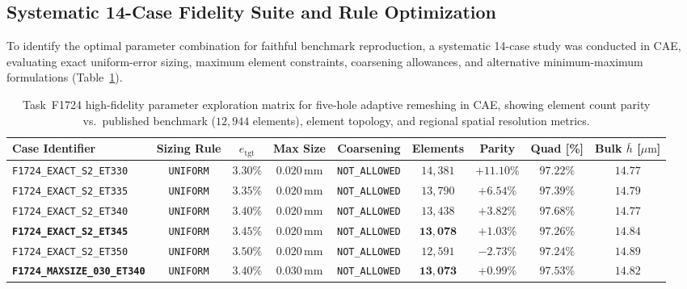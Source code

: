 \subsection{Systematic 14-Case Fidelity Suite and Rule Optimization}
\label{subsec:f1724_fidelity_suite}

To identify the optimal parameter combination for faithful benchmark reproduction, a systematic 14-case study was conducted in \Abaqus CAE, evaluating exact uniform-error sizing, maximum element constraints, coarsening allowances, and alternative minimum-maximum formulations (Table~\ref{tab:f1724_fidelity_matrix}).

\begin{table}[htbp]
\centering
\caption{Task~F1724 high-fidelity parameter exploration matrix for five-hole adaptive remeshing in \Abaqus CAE, showing element count parity vs.\ published benchmark ($12{,}944$ elements), element topology, and regional spatial resolution metrics.}
\label{tab:f1724_fidelity_matrix}
\footnotesize
\begin{tabular}{l c c c c c c c c}
\toprule
\textbf{Case Identifier} & \textbf{Sizing Rule} & $e_{\mathrm{tgt}}$ & \textbf{Max Size} & \textbf{Coarsening} & \textbf{Elements} & \textbf{Parity} & \textbf{Quad [\%]} & \textbf{Bulk $\bar{h}$ [$\mu\mathrm{m}$]} \\
\midrule
\texttt{F1724\_EXACT\_S2\_ET330} & \texttt{UNIFORM} & $3.30\%$ & $0.020\,\mathrm{mm}$ & \texttt{NOT\_ALLOWED} & $14{,}381$ & $+11.10\%$ & $97.22\%$ & $14.77$ \\
\texttt{F1724\_EXACT\_S2\_ET335} & \texttt{UNIFORM} & $3.35\%$ & $0.020\,\mathrm{mm}$ & \texttt{NOT\_ALLOWED} & $13{,}790$ & $+6.54\%$ & $97.39\%$ & $14.79$ \\
\texttt{F1724\_EXACT\_S2\_ET340} & \texttt{UNIFORM} & $3.40\%$ & $0.020\,\mathrm{mm}$ & \texttt{NOT\_ALLOWED} & $13{,}438$ & $+3.82\%$ & $97.68\%$ & $14.77$ \\
\textbf{\texttt{F1724\_EXACT\_S2\_ET345}} & \texttt{UNIFORM} & $\mathbf{3.45\%}$ & $\mathbf{0.020\,\mathrm{mm}}$ & \texttt{NOT\_ALLOWED} & $\mathbf{13{,}078}$ & $\mathbf{+1.03\%}$ & $\mathbf{97.26\%}$ & $\mathbf{14.84}$ \\
\texttt{F1724\_EXACT\_S2\_ET350} & \texttt{UNIFORM} & $3.50\%$ & $0.020\,\mathrm{mm}$ & \texttt{NOT\_ALLOWED} & $12{,}591$ & $-2.73\%$ & $97.24\%$ & $14.89$ \\
\midrule
\textbf{\texttt{F1724\_MAXSIZE\_030\_ET340}} & \texttt{UNIFORM} & $\mathbf{3.40\%}$ & $\mathbf{0.030\,\mathrm{mm}}$ & \texttt{NOT\_ALLOWED} & $\mathbf{13{,}073}$ & $\mathbf{+0.99\%}$ & $\mathbf{97.53\%}$ & $\mathbf{14.82}$ \\

\end{tabular}
\end{table}

